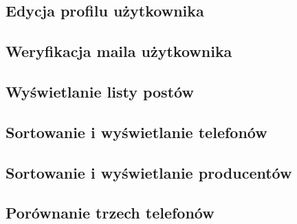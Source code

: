 \subsection{Edycja profilu użytkownika}

\subsection{Weryfikacja maila użytkownika}

\subsection{Wyświetlanie listy postów}

\subsection{Sortowanie i wyświetlanie telefonów}

\subsection{Sortowanie i wyświetlanie producentów}

\subsection{Porównanie trzech telefonów}
